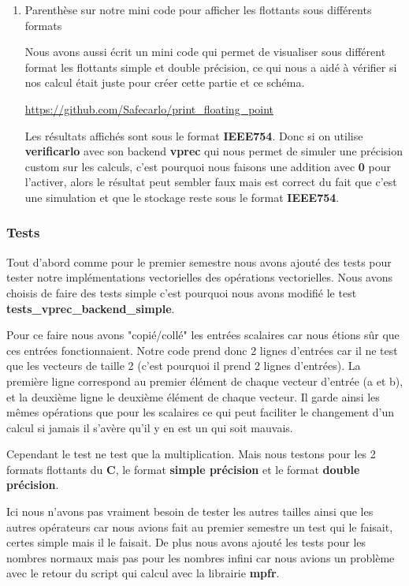 \documentclass[11pt, letterpaper]{article}
\begin{document}
\begin{enumerate}
\item Parenthèse sur notre mini code pour afficher les flottants sous différents formats
\label{sec:org0020b3e}

Nous avons aussi écrit un mini code qui permet de visualiser sous différent
format les flottants simple et double précision, ce qui nous a aidé à
vérifier si nos calcul était juste pour créer cette partie et ce schéma.

\url{https://github.com/Safecarlo/print\_floating\_point}

Les résultats affichés sont sous le format \textbf{IEEE754}. Donc si on utilise
\textbf{verificarlo} avec son backend \textbf{vprec} qui nous permet de simuler une
précision custom sur les calculs, c'est pourquoi nous faisons une addition
avec \textbf{0} pour l'activer, alors le résultat peut sembler faux mais est
correct du fait que c'est une simulation et que le stockage reste sous le
format \textbf{IEEE754}.
\end{enumerate}

\subsubsection{Tests}
\label{sec:org74944f3}

Tout d'abord comme pour le premier semestre nous avons ajouté des tests pour
tester notre implémentations vectorielles des opérations vectorielles. Nous
avons choisis de faire des tests simple c'est pourquoi nous avons modifié
le test \textbf{tests\_vprec\_backend\_simple}.

Pour ce faire nous avons "copié/collé" les entrées scalaires car nous étions
sûr que ces entrées fonctionnaient. Notre code prend donc 2 lignes d'entrées car il
ne test que les vecteurs de taille 2 (c'est pourquoi il prend 2 lignes
d'entrées). La première ligne correspond au premier élément de chaque vecteur
d'entrée (a et b), et la deuxième ligne le deuxième élément de chaque
vecteur. Il garde ainsi les mêmes opérations que pour les scalaires ce qui
peut faciliter le changement d'un calcul si jamais il s'avère qu'il y en est
un qui soit mauvais.

Cependant le test ne test que la multiplication. Mais nous testons pour les
2 formats flottants du \textbf{C}, le format \textbf{simple précision} et le format
\textbf{double précision}.

Ici nous n'avons pas vraiment besoin de tester les autres tailles ainsi que
les autres opérateurs car nous avions fait au premier semestre un test qui
le faisait, certes simple mais il le faisait. De plus nous avons ajouté les
tests pour les nombres normaux mais pas pour les nombres infini car nous
avions un problème avec le retour du script qui calcul avec la librairie
\textbf{mpfr}.
\end{document}
